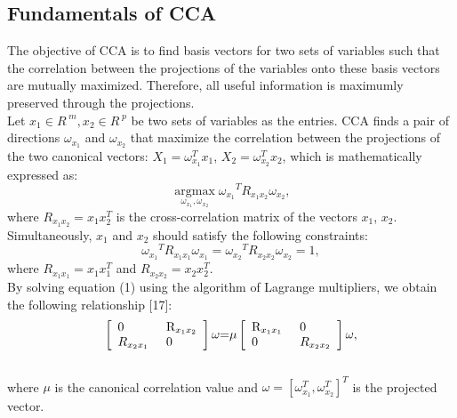\documentclass[journal]{IEEEtran}
\begin{document}
\subsection{Fundamentals of CCA}
The objective of CCA is to find basis vectors for two sets of variables such that the correlation between the projections of the variables onto these basis vectors are mutually maximized. Therefore, all useful information is maximumly preserved through the projections.\\\indent Let $ x_1 \in {R^{\;m}},x_2 \in {R^{\;p }} $ be two sets of variables as the entries. CCA finds a pair of directions $ \omega_{x_1} $ and $ \omega_{x_2} $ that maximize the correlation between the projections of the two canonical vectors: $ X_1 = \omega_{x_1}^Tx_1  $, $ X_2 = \omega_{x_2}^Tx_2  $, which is mathematically expressed as:
\begin{equation} \mathop {\arg \max }\limits_{{\omega _{x_1}},{\omega _{x_2}}} {\omega _{x_1}}^T{R_{x_1x_2}}{\omega _{x_2}},\end{equation} where ${R_{x_1x_2}} = x_1{x_2^T}$ is the cross-correlation matrix of the vectors $ x_1 $, $ x_2 $.\\\indent Simultaneously, $ x_1 $ and $ x_2 $ should satisfy the following constraints:
\begin{equation} {\omega _{x_1}}^T{R_{x_1x_1}}{\omega _{x_1}} = {\omega _{x_2}}^T{R_{x_2x_2}}{\omega _{x_2}} = 1, \end{equation}
where ${R_{x_1x_1}} = x_1{x_1^T}$ and ${R_{x_2x_2}} = x_2{x_2^T}$. \\\indent By solving equation (1) using the algorithm of Lagrange multipliers, we obtain the following relationship [17]:
\begin{equation} \left[ \begin{array}{l}
 0{\rm{        }} \\
 {R_{x_2x_1}}{\rm{     }} \\
 \end{array} \right.\left. \begin{array}{l}
 {{\rm{R}}_{x_1x_2}} \\
 {\rm{0}} \\
 \end{array} \right]\omega {\rm{ = }}\mu \left[ \begin{array}{l}
 {{\rm{R}}_{x_1x_1}}{\rm{        }} \\
 {\rm{   0  }} \\
 \end{array} \right.\left. \begin{array}{l}
 0 \\
 {R_{x_2x_2}} \\
 \end{array} \right]\omega,
 \end{equation} \\ where $ \mu $ is the canonical correlation value and $\omega  = {[{\omega _{x_1}^T},{\omega _{x_2}^T}]^T}$ is the projected vector.
\end{document}
